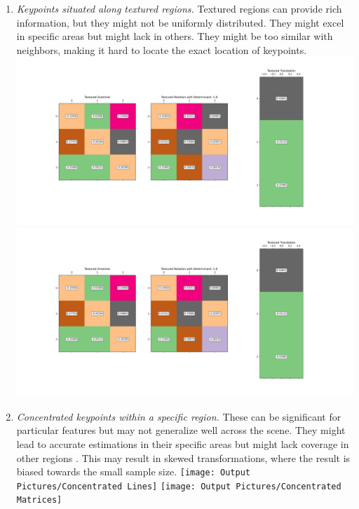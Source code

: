 \documentclass[11pt]{article}
\begin{document}
\begin{itemize}
\begin{enumerate}
            \item \textit{Keypoints situated along textured regions.}\newline
            Textured regions can provide rich information, but they might not be uniformly distributed.
            They might excel in specific areas but might lack in others. They might be too similar with neighbors,
            making it hard to locate the exact location of keypoints.\newline
            \includegraphics[width=\textwidth]{Output Pictures/Textured Lines}\newline
            \includegraphics[width=\textwidth]{Output Pictures/Textured Matrices}\newline

            \item \textit{Concentrated keypoints within a specific region.}\newline
            These can be significant for particular features but may not generalize well across the scene.
            They might lead to accurate estimations in their specific areas but might lack coverage in other regions
            . This may result in skewed transformations, where the result is biased towards the small sample size.\newline
            \texttt{[image: Output Pictures/Concentrated Lines]}\newline
            \texttt{[image: Output Pictures/Concentrated Matrices]}\newline


\end{enumerate}
\end{itemize}
\end{document}
